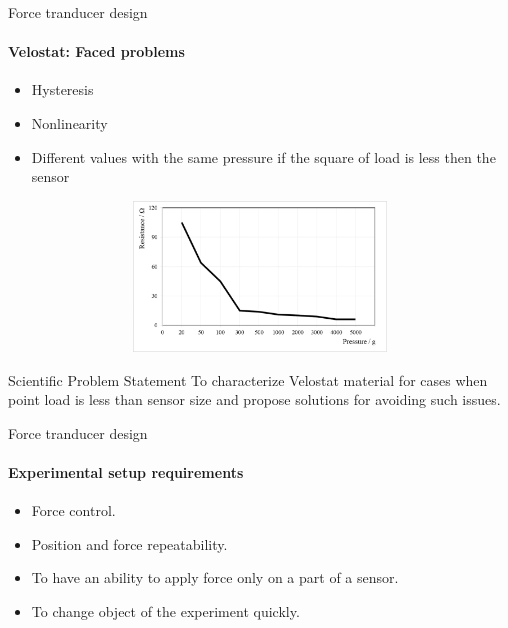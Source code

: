\documentclass[aspectratio=169]{beamer}
\begin{document}
\begin{frame}[t]{Force tranducer design}
    \framesubtitle{Velostat: Faced problems}
    \vspace{-20pt}
    \begin{multicols}{2}
        {\Large
            \begin{itemize}
                \item Hysteresis
                \item Nonlinearity
                \item Different values with the same pressure if the square of load is less then the sensor
            \end{itemize}}
        \begin{figure}[H]
            \centering\includegraphics[height=4cm,width=1\textwidth,keepaspectratio]{velostat_pressure_resistance.jpg}
            \label{fig:velostat_pressure_resistance.jpg}
        \end{figure}
    \end{multicols}
    \vspace{-12pt}
    \begin{block}{Scientific Problem Statement}
        To characterize Velostat material for cases when point load is less than sensor size and propose solutions for avoiding such issues.
    \end{block}
\end{frame}

\begin{frame}[t]{Force tranducer design}
    \framesubtitle{Experimental setup requirements}
    {\Large
        \begin{itemize}
            \item Force control.
            \item Position and force repeatability.
            \item To have an ability to apply force only on a part of a sensor.
            \item To change object of the experiment quickly.
        \end{itemize}}
\end{frame}
\end{document}
